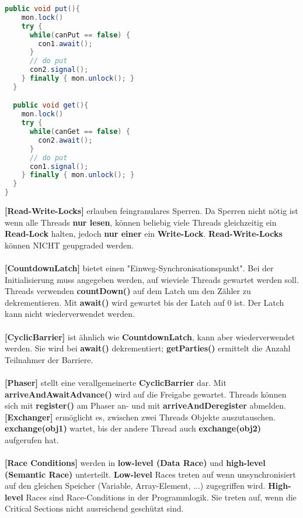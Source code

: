 \documentclass[8pt]{extarticle}
\let\oldtextbf\textbf
\renewcommand{\textbf}{\tiny\oldtextbf}
\begin{document}
\begin{multicols*}{5}
\begin{lstlisting}[language=java]
  public void put(){
    mon.lock()
    try {
      while(canPut == false) {
        con1.await();
      }
      // do put
      con2.signal();
    } finally { mon.unlock(); }
  }

  public void get(){
    mon.lock()
    try {
      while(canGet == false) {
        con2.await();
      }
      // do put
      con1.signal();
    } finally { mon.unlock(); }
  }
}
\end{lstlisting}
\textbf{[Read-Write-Locks]} erlauben feingranulares Sperren. Da Sperren nicht nötig ist wenn alle Threads \textbf{nur lesen}, können beliebig viele Threads gleichzeitig ein \textbf{Read-Lock} halten, jedoch \textbf{nur einer} ein \textbf{Write-Lock}. \textbf{Read-Write-Locks} können NICHT geupgraded werden.\\\\
\textbf{[CountdownLatch]} bietet einen "Einweg-Synchronisationspunkt". Bei der Initialisierung muss angegeben werden, auf wieviele Threads gewartet werden soll. Threads verwenden \textbf{countDown()} auf dem Latch um den Zähler zu dekrementieren. Mit \textbf{await()} wird gewartet bis der Latch auf 0 ist. Der Latch kann nicht wiederverwendet werden.\\\\
\textbf{[CyclicBarrier]} ist ähnlich wie \textbf{CountdownLatch}, kann aber wiederverwendet werden. Sie wird bei \textbf{await()} dekrementiert; \textbf{getParties()} ermittelt die Anzahl Teilnahmer der Barriere.\\\\
\textbf{[Phaser]} stellt eine verallgemeinerte \textbf{CyclicBarrier} dar. Mit \textbf{arriveAndAwaitAdvance()} wird auf die Freigabe gewartet. Threads können sich mit \textbf{register()} am Phaser an- und mit \textbf{arriveAndDeregister} abmelden.\\
\textbf{[Exchanger]} ermöglicht es, zwischen zwei Threads Objekte auszutauschen. \textbf{exchange(obj1)} wartet, bis der andere Thread auch \textbf{exchange(obj2)} aufgerufen hat.\\\\
\textbf{[Race Conditions]} werden in \textbf{low-level (Data Race)} und \textbf{high-level (Semantic Race)} unterteilt. \textbf{Low-level} Races treten auf wenn unsynchronisiert auf den gleichen Speicher (Variable, Array-Element, ...) zugegriffen wird. \textbf{High-level} Races sind Race-Conditions in der Programmlogik. Sie treten auf, wenn die Critical Sections nicht ausreichend geschützt sind.\\\\

\end{multicols*}
\end{document}
